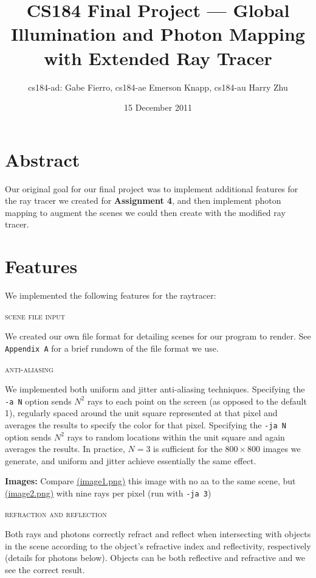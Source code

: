 \documentclass{article}
\title{CS184 Final Project --- Global Illumination and Photon Mapping with Extended Ray Tracer}
\author{cs184-ad: Gabe Fierro, cs184-ae Emerson Knapp, cs184-au Harry Zhu}
\date{15 December 2011}
\begin{document}
\maketitle

\section*{Abstract}

Our original goal for our final project was to implement additional features for the ray tracer we created for {\bf Assignment 4}, and then implement photon mapping to augment the scenes we could then create with the modified ray tracer. 

\tableofcontents

\section{Features} %
\label{sec:features}

We implemented the following features for the raytracer:

\begin{center}\textsc{scene file input}\end{center} 
We created our own file format for detailing scenes for our program to render. See \verb+Appendix A+ for a brief rundown of the file format we use.

\begin{center}\textsc{anti-aliasing}\end{center} 
We implemented both uniform and jitter anti-aliasing techniques. Specifying the \verb+-a N+ option sends $N^2$ rays to each point on the screen (as opposed to the default 1), regularly spaced around the unit square represented at that pixel and averages the results to specify the color for that pixel. Specifying the \verb+-ja N+ option sends $N^2$ rays to random locations within the unit square and again averages the results. In practice, $N=3$ is sufficient for the $800\times 800$ images we generate, and uniform and jitter achieve essentially the same effect.

\vspace{3mm}
{\bf Images:} Compare \href{run://images/image1.png}{\underline{(image1.png)}} this image with no aa  to the same scene, but \href{run://images/image2.png}{\underline{(image2.png)}} with nine rays per pixel (run with \verb+-ja 3+)


\begin{center}\textsc{refraction and reflection}\end{center} 
Both rays and photons correctly refract and reflect when intersecting with objects in the scene according to the object's refractive index and reflectivity, respectively (details for photons below). Objects can be both reflective and refractive and we see the correct result. 
\end{document}
